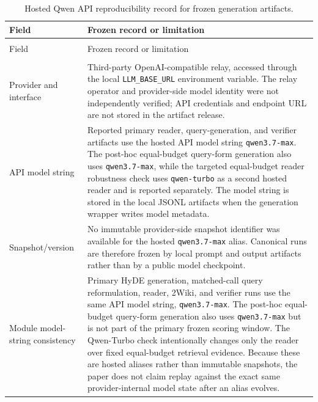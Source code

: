 \begingroup
\footnotesize
\setlength{\tabcolsep}{3pt}
\begin{longtable}{>{\raggedright\arraybackslash}p{}
                            >{\raggedright\arraybackslash}p{}}
\caption{Hosted Qwen API reproducibility record for frozen generation artifacts.}
\label{tab:qwen_api_reproducibility}\\
\toprule
Field & Frozen record or limitation \\
\midrule
\endfirsthead
\multicolumn{2}{l}{\footnotesize\itshape Table~\thetable\ continued}\\
\toprule
Field & Frozen record or limitation \\
\midrule
\endhead
\midrule
\multicolumn{2}{r}{\footnotesize Continued on next page}\\
\endfoot
\bottomrule
\endlastfoot
Provider and interface & Third-party OpenAI-compatible relay, accessed through the local \texttt{LLM\_BASE\_URL} environment variable. The relay operator and provider-side model identity were not independently verified; API credentials and endpoint URL are not stored in the artifact release. \\
API model string & Reported primary reader, query-generation, and verifier artifacts use the hosted API model string \texttt{qwen3.7-max}. The post-hoc equal-budget query-form generation also uses \texttt{qwen3.7-max}, while the targeted equal-budget reader robustness check uses \texttt{qwen-turbo} as a second hosted reader and is reported separately. The model string is stored in the local JSONL artifacts when the generation wrapper writes model metadata. \\
Snapshot/version & No immutable provider-side snapshot identifier was available for the hosted \texttt{qwen3.7-max} alias. Canonical runs are therefore frozen by local prompt and output artifacts rather than by a public model checkpoint. \\
Module model-string consistency & Primary HyDE generation, matched-call query reformulation, reader, 2Wiki, and verifier runs use the same API model string, \texttt{qwen3.7-max}. The post-hoc equal-budget query-form generation also uses \texttt{qwen3.7-max} but is not part of the primary frozen scoring window. The Qwen-Turbo check intentionally changes only the reader over fixed equal-budget retrieval evidence. Because these are hosted aliases rather than immutable snapshots, the paper does not claim replay against the exact same provider-internal model state after an alias evolves. \\

\end{longtable}
